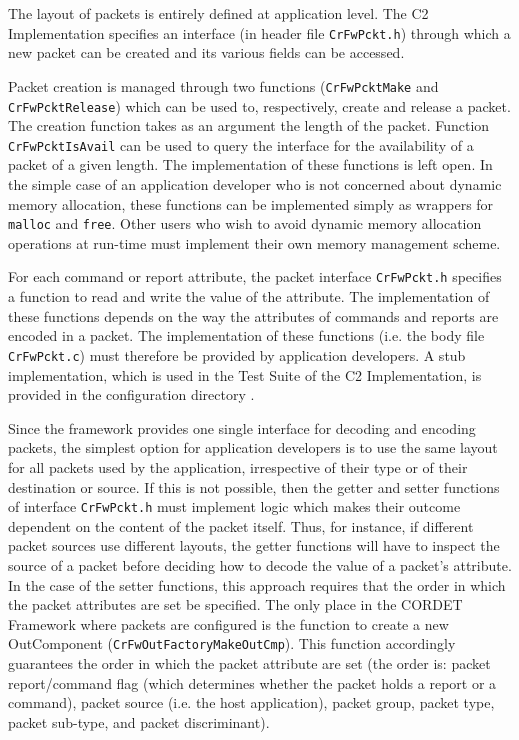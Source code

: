 \documentclass{pnp_article}
\begin{document}
The layout of packets is entirely defined at application level. The C2 Implementation specifies an interface (in header file \texttt{CrFwPckt.h}) through which a new packet can be created and its various fields can be accessed. 

Packet creation is managed through two functions (\texttt{CrFwPcktMake} and \texttt{CrFwPcktRelease}) which can be used to, respectively, create and release a packet. The creation function takes as an argument the length of the packet. Function \texttt{CrFwPcktIsAvail} can be used to query the interface for the availability of a packet of a given length. The implementation of these functions is left open. In the simple case of an application developer who is not concerned about dynamic memory allocation, these functions can be implemented simply as wrappers for \texttt{malloc} and \texttt{free}. Other users who wish to avoid dynamic memory allocation operations at run-time must implement their own memory management scheme.

For each command or report attribute, the packet interface \texttt{CrFwPckt.h} specifies a function to read and write the value of the attribute. The implementation of these functions depends on the way the attributes of commands and reports are encoded in a packet. The implementation of these functions (i.e. the body file \texttt{CrFwPckt.c}) must therefore be provided by application developers. A stub implementation, which is used in the Test Suite of the C2 Implementation, is provided in the configuration directory .

Since the framework provides one single interface for decoding and encoding packets, the simplest option for application developers is to use the same layout for all packets used by the application, irrespective of their type or of their destination or source. If this is not possible, then the getter and setter functions of interface \texttt{CrFwPckt.h} must implement logic which makes their outcome dependent on the content of the packet itself. Thus, for instance, if different packet sources use different layouts, the getter functions will have to inspect the source of a packet before deciding how to decode the value of a packet's attribute. In the case of the setter functions, this approach requires that the order in which the packet attributes are set be specified. The only place in the CORDET Framework where packets are configured is the function to create a new OutComponent (\texttt{CrFwOutFactoryMakeOutCmp}). This function accordingly guarantees the order in which the packet attribute are set (the order is: packet report/command flag (which determines whether the packet holds a report or a command), packet source (i.e. the host application), packet group, packet type, packet sub-type, and packet discriminant).
\end{document}
